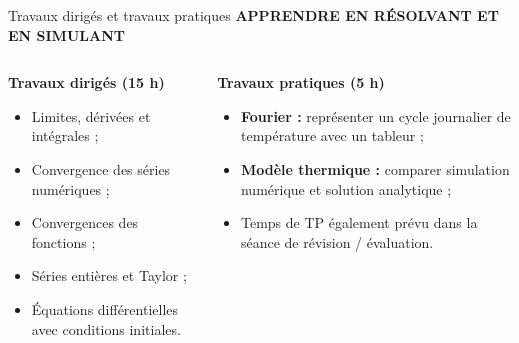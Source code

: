 \documentclass[aspectratio=169,10pt]{beamer}
\newcommand{\meta}[1]{{\small\bfseries\color{turquoise} #1}\par\vspace{0.07cm}}
\newcommand{\smalllist}{\setlength{\itemsep}{0.04cm}\setlength{\parskip}{0pt}}
\begin{document}
\begin{frame}{Travaux dirigés et travaux pratiques}
\meta{APPRENDRE EN RÉSOLVANT ET EN SIMULANT}
\begin{columns}[T,onlytextwidth]
\begin{tcolorbox}[colback=pale,colframe=pale,height=4.05cm]
{\color{bleu}\large\bfseries Travaux dirigés (15 h)}\par\vspace{0.28cm}
\small
\begin{itemize}\smalllist
\item Limites, dérivées et intégrales ;
\item Convergence des séries numériques ;
\item Convergences des fonctions ;
\item Séries entières et Taylor ;
\item Équations différentielles avec conditions initiales.
\end{itemize}
\end{tcolorbox}
\begin{tcolorbox}[colback=palevert,colframe=palevert,height=4.05cm]
{\color{turquoise}\large\bfseries Travaux pratiques (5 h)}\par\vspace{0.28cm}
\small
\begin{itemize}\smalllist
\item \textbf{Fourier :} représenter un cycle journalier de température avec un tableur ;
\item \textbf{Modèle thermique :} comparer simulation numérique et solution analytique ;
\item Temps de TP également prévu dans la séance de révision / évaluation.
\end{itemize}
\end{tcolorbox}
\end{columns}
\end{frame}
\end{document}
